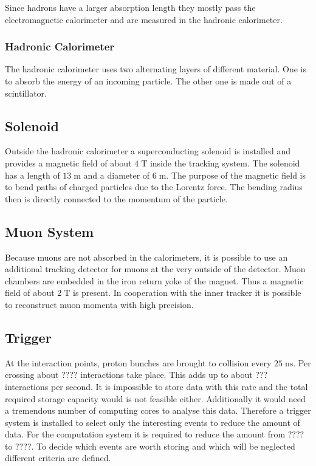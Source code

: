 	Since hadrons have a larger absorption length they mostly pass the electromagnetic calorimeter and are measured in the hadronic calorimeter.
\subsubsection{Hadronic Calorimeter}
	The hadronic calorimeter uses two alternating layers of different material. One is to absorb the energy of an incoming particle. The other one is made out of a scintillator.
	
\subsection{Solenoid}
	Outside the hadronic calorimeter a superconducting solenoid is installed and provides a magnetic field of about $4\;\text{T}$ inside the tracking system. The solenoid has a length of $13\;\text{m}$ and a diameter of $6\;\text{m}$. The purpose of the magnetic field is to bend paths of charged particles due to the Lorentz force. The bending radius then is directly connected to the momentum of the particle.  
\subsection{Muon System}
\label{sec:muonsystem}
	Because muons are not absorbed in the calorimeters, it is possible to use an additional tracking detector for muons at the very outside of the detector. Muon chambers are embedded in the iron return yoke of the magnet. Thus a magnetic field of about $2\;\text{T}$ is present.
	In cooperation with the inner tracker it is possible to reconstruct muon momenta with high precision.
\subsection{Trigger}
\label{sec:trigger}
	At the interaction points, proton bunches are brought to collision every $25\;\text{ns}$. Per crossing about ????
	interactions take place. This adds up to about ???
	interactions per second. It is impossible to store data with this rate and the total required storage capacity would is not feasible either. Additionally it would need a tremendous number of computing cores to analyse this data. Therefore a trigger system is installed to select only the interesting events to reduce the amount of data. For the computation system it is required to reduce the amount from ???? to ????.
 	To decide which events are worth storing and which will be neglected different criteria are defined.
	
	